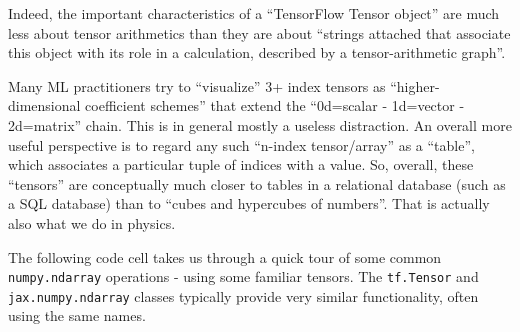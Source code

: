 \documentclass[11pt]{article}
\begin{document}
Indeed, the important characteristics of a ``TensorFlow Tensor object''
are much less about tensor arithmetics than they are about ``strings
attached that associate this object with its role in a calculation,
described by a tensor-arithmetic graph''.

Many ML practitioners try to ``visualize'' 3+ index tensors as
``higher-dimensional coefficient schemes'' that extend the ``0d=scalar -
1d=vector - 2d=matrix'' chain. This is in general mostly a useless
distraction. An overall more useful perspective is to regard any such
``n-index tensor/array'' as a ``table'', which associates a particular
tuple of indices with a value. So, overall, these ``tensors'' are
conceptually much closer to tables in a relational database (such as a
SQL database) than to ``cubes and hypercubes of numbers''. That is
actually also what we do in physics.

The following code cell takes us through a quick tour of some common
\texttt{numpy.ndarray} operations - using some familiar tensors. The
\texttt{tf.Tensor} and \texttt{jax.numpy.ndarray} classes typically
provide very similar functionality, often using the same names.
\end{document}

